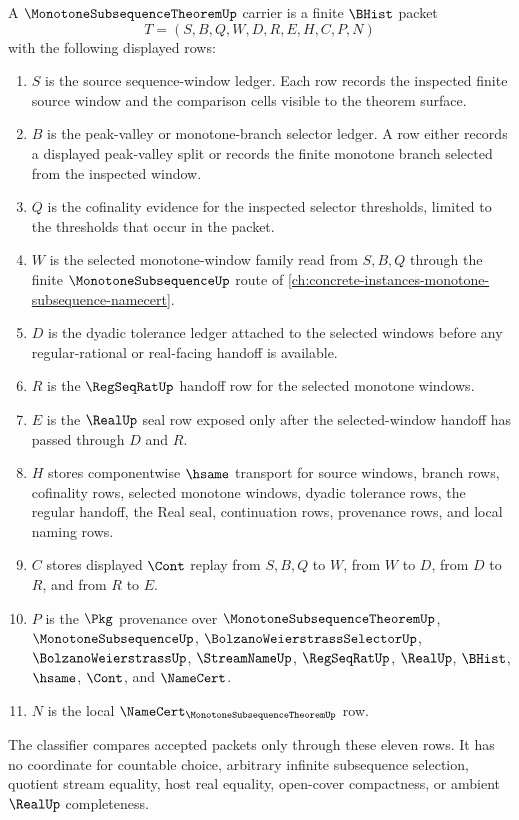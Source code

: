 \begin{definition}
\label{def:monotone-subsequence-theorem-carrier}
A $\MonotoneSubsequenceTheoremUp$ carrier is a finite $\BHist$ packet
$$
T=(S,B,Q,W,D,R,E,H,C,P,N)
$$
with the following displayed rows:
\begin{enumerate}
\item $S$ is the source sequence-window ledger. Each row records the inspected finite source window and the comparison cells visible to the theorem surface.
\item $B$ is the peak-valley or monotone-branch selector ledger. A row either records a displayed peak-valley split or records the finite monotone branch selected from the inspected window.
\item $Q$ is the cofinality evidence for the inspected selector thresholds, limited to the thresholds that occur in the packet.
\item $W$ is the selected monotone-window family read from $S,B,Q$ through the finite $\MonotoneSubsequenceUp$ route of \autoref{ch:concrete-instances-monotone-subsequence-namecert}.
\item $D$ is the dyadic tolerance ledger attached to the selected windows before any regular-rational or real-facing handoff is available.
\item $R$ is the $\RegSeqRatUp$ handoff row for the selected monotone windows.
\item $E$ is the $\RealUp$ seal row exposed only after the selected-window handoff has passed through $D$ and $R$.
\item $H$ stores componentwise $\hsame$ transport for source windows, branch rows, cofinality rows, selected monotone windows, dyadic tolerance rows, the regular handoff, the Real seal, continuation rows, provenance rows, and local naming rows.
\item $C$ stores displayed $\Cont$ replay from $S,B,Q$ to $W$, from $W$ to $D$, from $D$ to $R$, and from $R$ to $E$.
\item $P$ is the $\Pkg$ provenance over $\MonotoneSubsequenceTheoremUp$, $\MonotoneSubsequenceUp$, $\BolzanoWeierstrassSelectorUp$, $\BolzanoWeierstrassUp$, $\StreamNameUp$, $\RegSeqRatUp$, $\RealUp$, $\BHist$, $\hsame$, $\Cont$, and $\NameCert$.
\item $N$ is the local $\NameCert_{\MonotoneSubsequenceTheoremUp}$ row.
\end{enumerate}
The classifier compares accepted packets only through these eleven rows. It has no coordinate for countable choice, arbitrary infinite subsequence selection, quotient stream equality, host real equality, open-cover compactness, or ambient $\RealUp$ completeness.
\end{definition}

